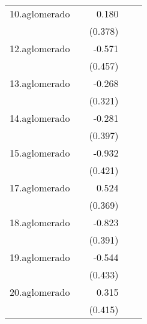 {\begin{longtable}{l*{4}{D{.}{.}{-1}}}
\addlinespace
10.aglomerado&                     &       0.180         &                     &                     \\
            &                     &     (0.378)         &                     &                     \\
\addlinespace
12.aglomerado&                     &      -0.571         &                     &                     \\
            &                     &     (0.457)         &                     &                     \\
\addlinespace
13.aglomerado&                     &      -0.268         &                     &                     \\
            &                     &     (0.321)         &                     &                     \\
\addlinespace
14.aglomerado&                     &      -0.281         &                     &                     \\
            &                     &     (0.397)         &                     &                     \\
\addlinespace
15.aglomerado&                     &      -0.932\sym{*}  &                     &                     \\
            &                     &     (0.421)         &                     &                     \\
\addlinespace
17.aglomerado&                     &       0.524         &                     &                     \\
            &                     &     (0.369)         &                     &                     \\
\addlinespace
18.aglomerado&                     &      -0.823\sym{*}  &                     &                     \\
            &                     &     (0.391)         &                     &                     \\
\addlinespace
19.aglomerado&                     &      -0.544         &                     &                     \\
            &                     &     (0.433)         &                     &                     \\
\addlinespace
20.aglomerado&                     &       0.315         &                     &                     \\
            &                     &     (0.415)         &                     &                     \\

\end{longtable}}
